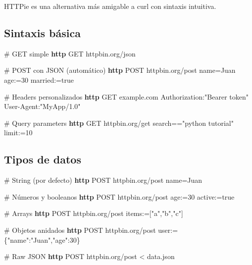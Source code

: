 \documentclass[
  11pt,
  letterpaper,
  oneside,
  openany]{scrbook}
\newenvironment{Shaded}{}{}
\newcommand{\CommentTok}[1]{\textcolor[rgb]{0.42,0.45,0.49}{#1}}
\newcommand{\ExtensionTok}[1]{\textcolor[rgb]{0.84,0.23,0.29}{\textbf{#1}}}
\newcommand{\NormalTok}[1]{\textcolor[rgb]{0.14,0.16,0.18}{#1}}
\newcommand{\OperatorTok}[1]{\textcolor[rgb]{0.14,0.16,0.18}{#1}}
\newcommand{\StringTok}[1]{\textcolor[rgb]{0.01,0.18,0.38}{#1}}
\begin{document}
HTTPie es una alternativa más amigable a curl con sintaxis intuitiva.

\subsection{Sintaxis básica}\label{sintaxis-buxe1sica-2}

\begin{Shaded}
\begin{Highlighting}[]
\CommentTok{\# GET simple}
\ExtensionTok{http}\NormalTok{ GET httpbin.org/json}

\CommentTok{\# POST con JSON (automático)}
\ExtensionTok{http}\NormalTok{ POST httpbin.org/post name=Juan age:=30 married:=true}

\CommentTok{\# Headers personalizados}
\ExtensionTok{http}\NormalTok{ GET example.com Authorization:}\StringTok{"Bearer token"}\NormalTok{ User{-}Agent:}\StringTok{"MyApp/1.0"}

\CommentTok{\# Query parameters}
\ExtensionTok{http}\NormalTok{ GET httpbin.org/get search==}\StringTok{"python tutorial"}\NormalTok{ limit:=10}
\end{Highlighting}
\end{Shaded}

\subsection{Tipos de datos}\label{tipos-de-datos}

\begin{Shaded}
\begin{Highlighting}[]
\CommentTok{\# String (por defecto)}
\ExtensionTok{http}\NormalTok{ POST httpbin.org/post name=Juan}

\CommentTok{\# Números y booleanos}
\ExtensionTok{http}\NormalTok{ POST httpbin.org/post age:=30 active:=true}

\CommentTok{\# Arrays}
\ExtensionTok{http}\NormalTok{ POST httpbin.org/post items:=}\StringTok{\textquotesingle{}["a","b","c"]\textquotesingle{}}

\CommentTok{\# Objetos anidados}
\ExtensionTok{http}\NormalTok{ POST httpbin.org/post user:=}\StringTok{\textquotesingle{}\{"name":"Juan","age":30\}\textquotesingle{}}

\CommentTok{\# Raw JSON}
\ExtensionTok{http}\NormalTok{ POST httpbin.org/post }\OperatorTok{\textless{}}\NormalTok{ data.json}
\end{Highlighting}
\end{Shaded}
\end{document}

